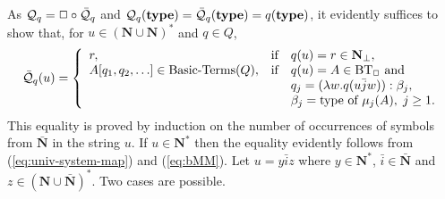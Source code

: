 \documentclass[fleqn]{LMCS}
\theoremstyle{plain}\newtheorem{satz}[thm]{Satz}
\theoremstyle{plain}\newtheorem{hyp}[thm]{Hypothesis}
\theoremstyle{plain}\newtheorem{hyps}[thm]{Hypotheses}
\theoremstyle{definition}\newtheorem{note}[thm]{Note}
\newcommand{\NN}{\mathbf{N}}
\newcommand{\bNN}{\bar{\NN}}
\newcommand{\bQQ}{\bar{\QQ}}
\newcommand{\Undef}{{\perp}}
\newcommand{\bj}{\bar{j}}
\newcommand{\bi}{\bar{i}}
\newcommand{\QQ}{{\mathcal Q}}
\newcommand{\?}{\mbox{?}}
\begin{document}
\proof
As $\QQ_q=\Erase\circ\bQQ_q$ 
and $\QQ_q(\type)=\bQQ_q(\type)=q(\type)$, 
it evidently suffices to show that, for $u\in(\NN\cup\NN)^*$ 
and $q\in Q$, 
\begin{equation}\label{eq:lemma:universal}
\bQQ_q(u)=\left\{
\begin{array}{lll}
r,                              & \textrm{if}&\qq(u)=r\in \NN_\Undef, \\
A[\qq_1,\qq_2,\ldots]\in\mbox{Basic-Terms}(Q),&\textrm{if}&\qq(u)=A\in\BT 
                                                                    \textrm{ and}\\
                                                    &            &
q_j=(\lambda w.\qq(u\bj w)):\beta_j,\ \\                     
                                                    &            &                      
\beta_j=\textrm{type of }\mu_j(A),\; j\ge1. \end{array}\right.                 
\end{equation}
This equality is proved by induction on the number of occurrences of symbols from $\bNN$ 
in the string $u$. If $u\in\NN^*$ 
then the equality evidently follows from (\ref{eq:univ-system-map}) and (\ref{eq:bMM}). 
Let $u=y\bi z$ where $y\in\NN^*$, $\bi\in\bNN$ and $z\in(\NN\cup\bNN)^*$. 
Two cases are possible. 
\end{document}
